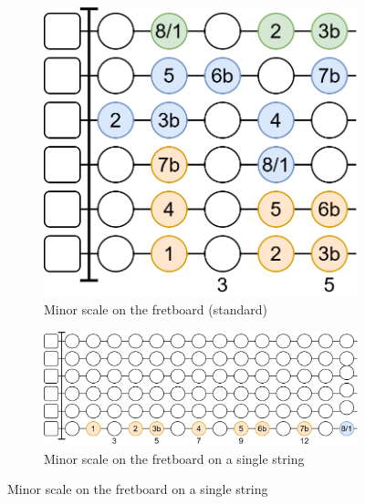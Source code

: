 \begin{figure}[h]
	\begin{subfigure}[b]{0.45\textwidth}
		\centering
		\includegraphics[height=0.175\textheight]{../../Images/guitar_minor_scale_standard.png}
		\caption{Minor scale on the fretboard (standard)}
		\label{fig:guitar_minor_scale_fretboard_standard}
	\end{subfigure}
	\hfill
	
	\vspace{0.5cm}
	\begin{subfigure}[b]{\textwidth}
		\centering
		\includegraphics[height=0.175\textheight]{../../Images/guitar_minor_scale_single_string.png}
		\caption{Minor scale on the fretboard on a single string}
		\label{fig:guitar_minor_scale_fretboard_single_string}
	\end{subfigure}
	

\end{figure}
